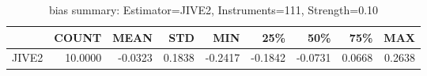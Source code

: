 \begin{table}[ht]
\centering
\caption{bias summary: Estimator=JIVE2, Instruments=111, Strength=0.10}
\begin{tabular}{lrrrrrrrr}
\toprule
 & COUNT & MEAN & STD & MIN & 25\% & 50\% & 75\% & MAX \\
\midrule
JIVE2 & 10.0000 & -0.0323 & 0.1838 & -0.2417 & -0.1842 & -0.0731 & 0.0668 & 0.2638 \\
\bottomrule
\end{tabular}
\end{table}
